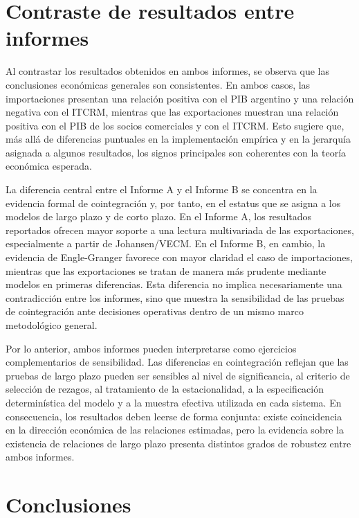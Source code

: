 \documentclass[11pt,a4paper]{article}
\begin{document}
	\section{Contraste de resultados entre informes}
	\label{subsec:contraste-resultados-informes}

	Al contrastar los resultados obtenidos en ambos informes, se observa que las conclusiones económicas generales son consistentes. En ambos casos, las importaciones presentan una relación positiva con el PIB argentino y una relación negativa con el ITCRM, mientras que las exportaciones muestran una relación positiva con el PIB de los socios comerciales y con el ITCRM. Esto sugiere que, más allá de diferencias puntuales en la implementación empírica y en la jerarquía asignada a algunos resultados, los signos principales son coherentes con la teoría económica esperada.

	La diferencia central entre el Informe A y el Informe B se concentra en la evidencia formal de cointegración y, por tanto, en el estatus que se asigna a los modelos de largo plazo y de corto plazo. En el Informe A, los resultados reportados ofrecen mayor soporte a una lectura multivariada de las exportaciones, especialmente a partir de Johansen/VECM. En el Informe B, en cambio, la evidencia de Engle-Granger favorece con mayor claridad el caso de importaciones, mientras que las exportaciones se tratan de manera más prudente mediante modelos en primeras diferencias. Esta diferencia no implica necesariamente una contradicción entre los informes, sino que muestra la sensibilidad de las pruebas de cointegración ante decisiones operativas dentro de un mismo marco metodológico general.

	Por lo anterior, ambos informes pueden interpretarse como ejercicios complementarios de sensibilidad. Las diferencias en cointegración reflejan que las pruebas de largo plazo pueden ser sensibles al nivel de significancia, al criterio de selección de rezagos, al tratamiento de la estacionalidad, a la especificación determinística del modelo y a la muestra efectiva utilizada en cada sistema. En consecuencia, los resultados deben leerse de forma conjunta: existe coincidencia en la dirección económica de las relaciones estimadas, pero la evidencia sobre la existencia de relaciones de largo plazo presenta distintos grados de robustez entre ambos informes.


	\section{Conclusiones}
	\label{sec:conclusiones}
\end{document}

